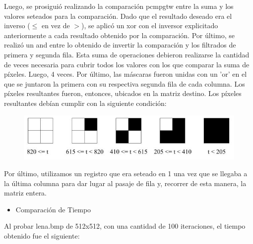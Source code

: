 \documentclass[10pt, a4paper]{article}
\begin{document}
\begin{itemize}
Luego, se prosiguió realizando la comparación pcmpgtw entre la suma y los valores seteados para la comparación. Dado que el resultado deseado era el inverso ($\leq$ en vez de $>$), se aplicó un xor con el inversor explicitado anteriormente a cada resultado obtenido por la comparación. Por último, se realizó un and entre lo obtenido de invertir la comparación y los filtrados de primera y segunda fila. Esta suma de operaciones debieron realizarse la cantidad de veces necesaria para cubrir todos los valores con los que comparar la suma de píxeles. Luego, 4 veces. Por último, las máscaras fueron unidas con un 'or' en el que se juntaron la primera con su respectiva segunda fila de cada columna. Los píxeles resultantes fueron, entonces, ubicados en la matriz destino.\newline
Los píxeles resultantes debían cumplir con la siguiente condición:
\begin{figure}[H] %
\begin{center}
\includegraphics[width=400pt]{./halftone.jpg}
\end{center}
\end{figure}
Por último, utilizamos un registro que era seteado en 1 una vez que se llegaba a la última columna para dar lugar al pasaje de fila y, recorrer de esta manera, la matriz entera.

\begin{itemize}
\item{Comparación de Tiempo}
\end{itemize}
Al probar lena.bmp de 512x512, con una cantidad de 100 iteraciones, el tiempo obtenido fue el siguiente:\newline



\end{itemize}
\end{document}
